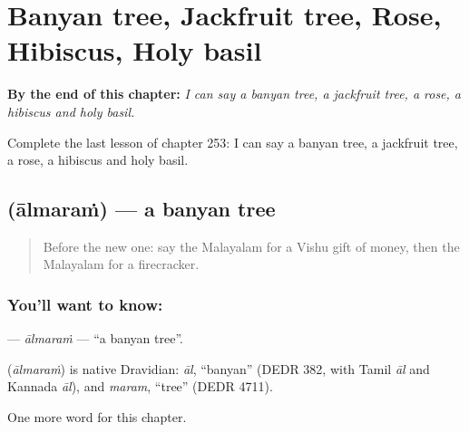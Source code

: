 
\chapter{Banyan tree, Jackfruit tree, Rose, Hibiscus, Holy basil}
\label{ch:ml-banyan-tree-jackfruit-tree-rose-hibiscus-holy-basil}

\begin{chapteropening}
\textbf{By the end of this chapter:} \emph{I can say a banyan tree, a jackfruit tree, a rose, a hibiscus and holy basil.}

Complete the last lesson of chapter 253: I can say a banyan tree, a jackfruit tree, a rose, a hibiscus and holy basil.
\end{chapteropening}

\section[\texorpdfstring{\ml{ആൽമരം} (ālmaraṁ)}{ആൽമരം (ālmaraṁ)}]{ (ālmaraṁ) — a banyan tree}

\label{lesson:ML-C253-almaram}



\begin{quote}
Before the new one: say the Malayalam for a Vishu gift of money, then the Malayalam for a firecracker.
\end{quote}

\subsection*{You'll want to know: }
\textbf{} — \emph{ālmaraṁ} — \textquotedblleft{}a banyan tree\textquotedblright{}.

\begin{cousinweb}
\textbf{} (\emph{ālmaraṁ}) is native Dravidian: \emph{āl}, \textquotedblleft{}banyan\textquotedblright{} (DEDR 382, with Tamil \emph{āl} and Kannada \emph{āl}), and \emph{maram}, \textquotedblleft{}tree\textquotedblright{} (DEDR 4711).
\end{cousinweb}

\begin{grammarlens}[title={What you've built}]
One more word for this chapter.
\end{grammarlens}

